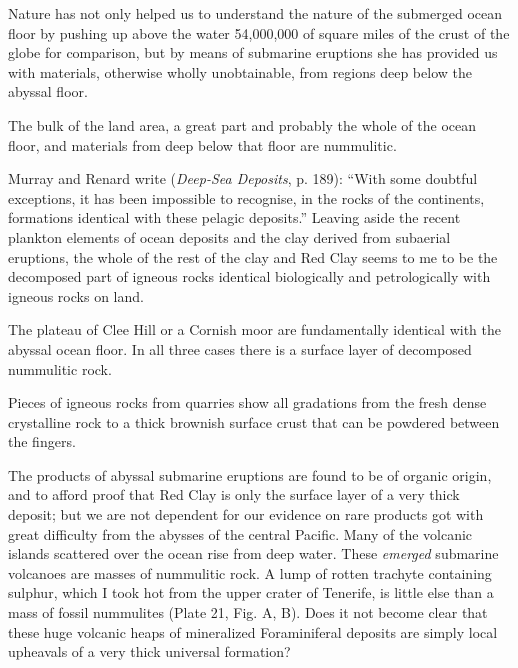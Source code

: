 \documentclass[a4paper, 12pt, oneside]{article}
\begin{document}
Nature has not only helped us to understand the nature of the submerged ocean floor by pushing up above the water 54,000,000 of square miles of the crust of the globe for comparison, but by means of submarine eruptions she has provided us with materials, otherwise wholly unobtainable, from regions deep below the abyssal floor.

The bulk of the land area, a great part and probably the whole of the ocean floor, and materials from deep below that floor are nummulitic.

Murray and Renard write (\emph{Deep-Sea Deposits}, p. 189): ``With some doubtful exceptions, it has been impossible to recognise, in the rocks of the continents, formations identical with these pelagic deposits.'' Leaving aside the recent plankton elements of ocean deposits and the clay derived from subaerial eruptions, the whole of the rest of the clay and Red Clay seems to me to be the decomposed part of igneous rocks identical biologically and petrologically with igneous rocks on land.

The plateau of Clee Hill or a Cornish moor are fundamentally identical with the abyssal ocean floor. In all three cases there is a surface layer of decomposed nummulitic rock.

Pieces of igneous rocks from quarries show all gradations from the fresh dense crystalline rock to a thick brownish surface crust that can be powdered between the fingers.

The products of abyssal submarine eruptions are found to be of organic origin, and to afford proof that Red Clay is only the surface layer of a very thick deposit; but we are not dependent for our evidence on rare products got with great difficulty from the abysses of the central Pacific. Many of the volcanic islands scattered over the ocean rise from deep water. These \emph{emerged} submarine volcanoes are masses of nummulitic rock. A lump of rotten trachyte containing sulphur, which I took hot from the upper crater of Tenerife, is little else than a mass of fossil nummulites (Plate 21, Fig. A, B). Does it not become clear that these huge volcanic heaps of mineralized Foraminiferal deposits are simply local upheavals of a very thick universal formation?
\end{document}
